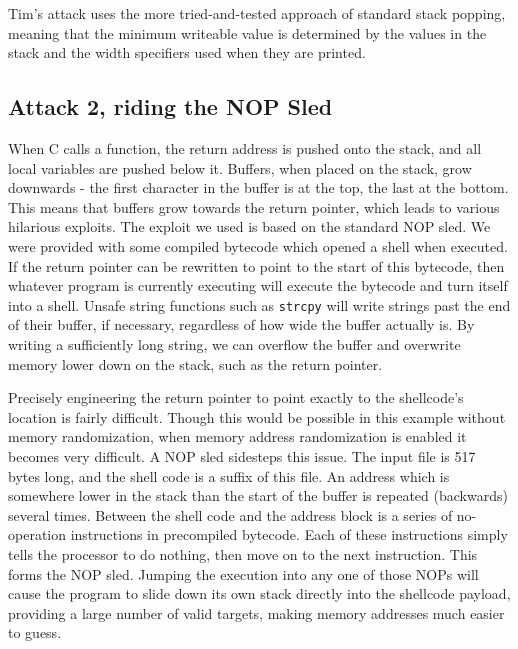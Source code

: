 Tim's attack uses the more tried-and-tested approach of standard stack popping, meaning that the minimum writeable value
is determined by the values in the stack and the width specifiers used when they are printed.

\subsection{Attack 2, riding the NOP Sled}

When C calls a function, the return address is pushed onto the stack, and all local variables are pushed below it.
Buffers, when placed on the stack, grow downwards - the first character in the buffer is at the top, the last at the
bottom. This means that buffers grow towards the return pointer, which leads to various hilarious exploits. The exploit
we used is based on the standard NOP sled. We were provided with some compiled bytecode which opened a shell when
executed. If the return pointer can be rewritten to point to the start of this bytecode, then whatever program is
currently executing will execute the bytecode and turn itself into a shell. Unsafe string functions such as {\tt strcpy}
will write strings past the end of their buffer, if necessary, regardless of how wide the buffer actually is. By writing
a sufficiently long string, we can overflow the buffer and overwrite memory lower down on the stack, such as the return
pointer.

Precisely engineering the return pointer to point exactly to the shellcode's location is fairly difficult. Though this
would be possible in this example without memory randomization, when memory address randomization is enabled it becomes
very difficult. A NOP sled sidesteps this issue. The input file is 517 bytes long, and the shell code is a suffix of
this file. An address which is somewhere lower in the stack than the start of the buffer is repeated (backwards) several
times. Between the shell code and the address block is a series of no-operation instructions in precompiled bytecode.
Each of these instructions simply tells the processor to do nothing, then move on to the next instruction. This forms
the NOP sled. Jumping the execution into any one of those NOPs will cause the program to slide down its own stack
directly into the shellcode payload, providing a large number of valid targets, making memory addresses much easier to
guess.

